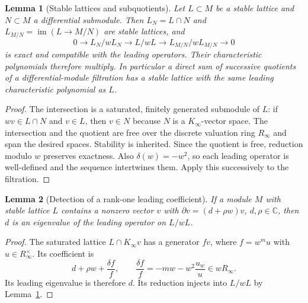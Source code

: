 \documentclass[11pt]{article}
\numberwithin{equation}{section}
\newtheorem{lemma}[lemma]{Lemma}
\theoremstyle{definition}
\theoremstyle{remark}
\newcommand{\C}{\mathbb C}
\begin{document}
\begin{lemma}[Stable lattices and subquotients]\label{lem:lattice}
Let $L\subset M$ be a stable lattice and $N\subset M$ a differential
submodule. Then $L_N=L\cap N$ and $L_{M/N}=\operatorname{im}(L\to M/N)$
are stable lattices, and
\[
 0\longrightarrow L_N/wL_N\longrightarrow L/wL
 \longrightarrow L_{M/N}/wL_{M/N}\longrightarrow0
\]
is exact and compatible with the leading operators. Their characteristic
polynomials therefore multiply. In particular a direct sum of successive
quotients of a differential-module filtration has a stable lattice with the
same leading characteristic polynomial as $L$.
\end{lemma}
\begin{proof}
The intersection is a saturated, finitely generated submodule of $L$:
if $wv\in L\cap N$ and $v\in L$, then $v\in N$ because $N$ is a
$K_\infty$-vector space. The intersection and the quotient are free over the
discrete valuation ring $R_\infty$ and span the desired spaces. Stability
is inherited. Since the quotient is free, reduction modulo $w$ preserves
exactness. Also $\delta(w)=-w^2$, so each leading operator is well-defined
and the sequence intertwines them. Apply this successively to the filtration.
\end{proof}

\begin{lemma}[Detection of a rank-one leading coefficient]\label{lem:rankone}
If a module $M$ with stable lattice $L$ contains a nonzero vector $v$ with
$\partial v=(d+\rho w)v$, $d,\rho\in\C$, then $d$ is an eigenvalue of the
leading operator on $L/wL$.
\end{lemma}
\begin{proof}
The saturated lattice $L\cap K_\infty v$ has a generator $fv$, where
$f=w^m u$ with $u\in R_\infty^\times$. Its coefficient is
\[
 d+\rho w+\frac{\delta f}{f},\qquad
 \frac{\delta f}{f}=-mw-w^2\frac{u_w}{u}\in wR_\infty.
\]
Its leading eigenvalue is therefore $d$. Its reduction injects into $L/wL$
by Lemma~\ref{lem:lattice}.
\end{proof}
\end{document}
